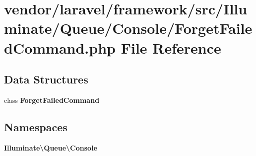 \section{vendor/laravel/framework/src/\+Illuminate/\+Queue/\+Console/\+Forget\+Failed\+Command.php File Reference}
\label{_forget_failed_command_8php}
\subsection*{Data Structures}
\begin{DoxyCompactItemize}
\item 
class {\bf Forget\+Failed\+Command}
\end{DoxyCompactItemize}
\subsection*{Namespaces}
\begin{DoxyCompactItemize}
\item 
 {\bf Illuminate\textbackslash{}\+Queue\textbackslash{}\+Console}
\end{DoxyCompactItemize}
